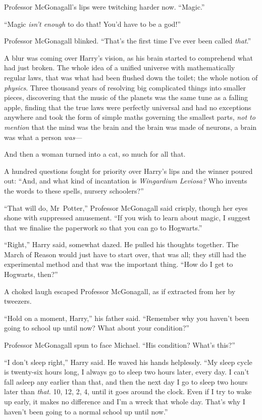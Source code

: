 Professor McGonagall’s lips were twitching harder now. “Magic.”

“Magic \emph{isn’t enough} to do that! You’d have to be a god!”

Professor McGonagall blinked. “That’s the first time I’ve ever been called \emph{that}.”

A blur was coming over Harry’s vision, as his brain started to comprehend what had just broken. The whole idea of a unified universe with mathematically regular laws, that was what had been flushed down the toilet; the whole notion of \emph{physics}. Three thousand years of resolving big complicated things into smaller pieces, discovering that the music of the planets was the same tune as a falling apple, finding that the true laws were perfectly universal and had no exceptions anywhere and took the form of simple maths governing the smallest parts, \emph{not to mention} that the mind was the brain and the brain was made of neurons, a brain was what a person \emph{was}—

And then a woman turned into a cat, so much for all that.

A hundred questions fought for priority over Harry’s lips and the winner poured out: “And, and what kind of incantation is \emph{Wingardium Leviosa?} Who invents the words to these spells, nursery schoolers?”

“That will do, Mr~Potter,” Professor McGonagall said crisply, though her eyes shone with suppressed amusement. “If you wish to learn about magic, I suggest that we finalise the paperwork so that you can go to Hogwarts.”

“Right,” Harry said, somewhat dazed. He pulled his thoughts together. The March of Reason would just have to start over, that was all; they still had the experimental method and that was the important thing. “How do I get to Hogwarts, then?”

A choked laugh escaped Professor McGonagall, as if extracted from her by tweezers.

“Hold on a moment, Harry,” his father said. “Remember why you haven’t been going to school up until now? What about your condition?”

Professor McGonagall spun to face Michael. “His condition? What’s this?”

“I don’t sleep right,” Harry said. He waved his hands helplessly. “My sleep cycle is twenty-six hours long, I always go to sleep two hours later, every day. I can’t fall asleep any earlier than that, and then the next day I go to sleep two hours later than \emph{that}. 10\pm, 12\am, 2\am, 4\am, until it goes around the clock. Even if I try to wake up early, it makes no difference and I’m a wreck that whole day. That’s why I haven’t been going to a normal school up until now.”

